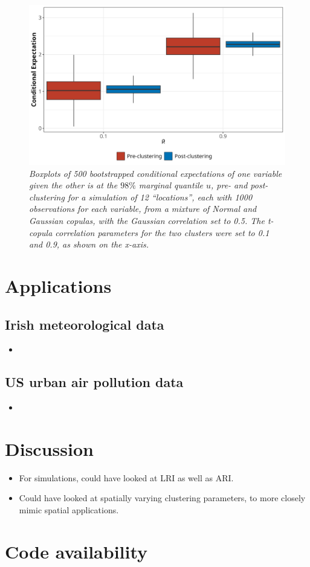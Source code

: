 \documentclass{article}
\numberwithin{equation}{section}
\begin{document}
\begin{figure}[H]
    \centering
    \includegraphics[width = 0.9\linewidth]{plots/sim_01e_bootstrap_box.png}
    \caption{\emph{Boxplots of 500 bootstrapped conditional expectations of one variable given the other is at the $98\%$ marginal quantile $u$, pre- and post-clustering for a simulation of 12 ``locations'', each with 1000 observations for each variable, from a mixture of Normal and Gaussian copulas, with the Gaussian correlation set to 0.5. The t-copula correlation parameters for the two clusters were set to 0.1 and 0.9, as shown on the x-axis.}}
    \label{fig:04_bootstrap}
\end{figure}


\section{Applications}
\subsection{Irish meteorological data} \label{subsec:app_irl}

\begin{itemize}
    \item 
\end{itemize}

\subsection{US urban air pollution data} \label{subsec:app_us}

\begin{itemize}
    \item 
\end{itemize}

\section{Discussion}

\begin{itemize}
  \item For simulations, could have looked at LRI as well as ARI.
  \item Could have looked at spatially varying clustering parameters, to more closely mimic spatial applications. 
\end{itemize}

\section*{Code availability}

\newpage

\end{document}
